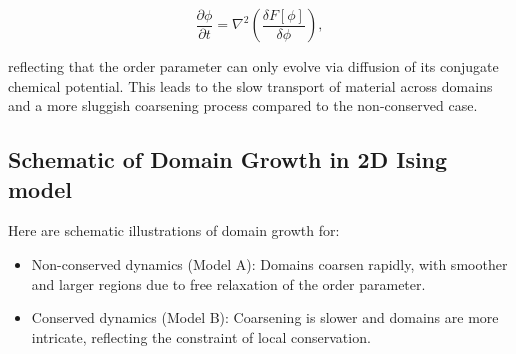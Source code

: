 \documentclass[
  letterpaper,
  enabledeprecatedfontcommands]{report}
\begin{document}
\[
\frac{\partial \phi}{\partial t} = \nabla^2 \left( \frac{\delta F[\phi]}{\delta \phi} \right),
\]

reflecting that the order parameter can only evolve via diffusion of its
conjugate chemical potential. This leads to the slow transport of
material across domains and a more sluggish coarsening process compared
to the non-conserved case.

\subsection{Schematic of Domain Growth in 2D Ising
model}\label{schematic-of-domain-growth-in-2d-ising-model}

Here are schematic illustrations of domain growth for:

\begin{itemize}
\item
  Non-conserved dynamics (Model A): Domains coarsen rapidly, with
  smoother and larger regions due to free relaxation of the order
  parameter.
\item
  Conserved dynamics (Model B): Coarsening is slower and domains are
  more intricate, reflecting the constraint of local conservation.
\end{itemize}
\end{document}
